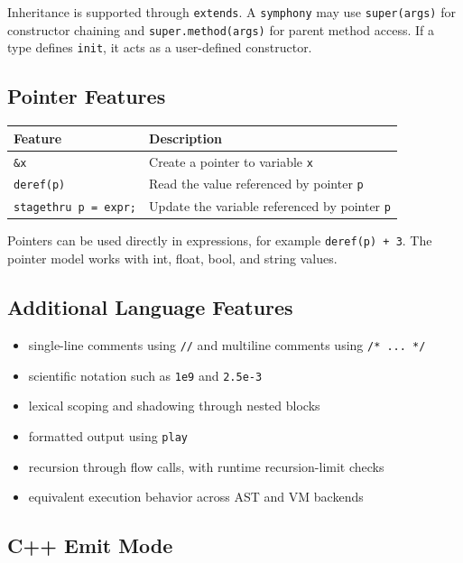 \documentclass[12pt,a4paper]{article}
\begin{document}
Inheritance is supported through \texttt{extends}. A \texttt{symphony} may use \texttt{super(args)} for constructor chaining and \texttt{super.method(args)} for parent method access. If a type defines \texttt{init}, it acts as a user-defined constructor.

\subsection*{Pointer Features}

\begin{table}[H]
\centering
\begin{tabularx}{\textwidth}{l X}
\toprule
\textnormal{Feature} & \textnormal{Description} \\
\midrule
\texttt{\&x} & Create a pointer to variable \texttt{x} \\
\texttt{deref(p)} & Read the value referenced by pointer \texttt{p} \\
\texttt{stagethru p = expr;} & Update the variable referenced by pointer \texttt{p} \\
\bottomrule
\end{tabularx}
\end{table}

Pointers can be used directly in expressions, for example \texttt{deref(p) + 3}. The pointer model works with int, float, bool, and string values.

\subsection*{Additional Language Features}

\begin{itemize}
\item single-line comments using \texttt{//} and multiline comments using \texttt{/* ... */}
\item scientific notation such as \texttt{1e9} and \texttt{2.5e-3}
\item lexical scoping and shadowing through nested blocks
\item formatted output using \texttt{play}
\item recursion through flow calls, with runtime recursion-limit checks
\item equivalent execution behavior across AST and VM backends
\end{itemize}

\subsection*{C++ Emit Mode}
\end{document}
